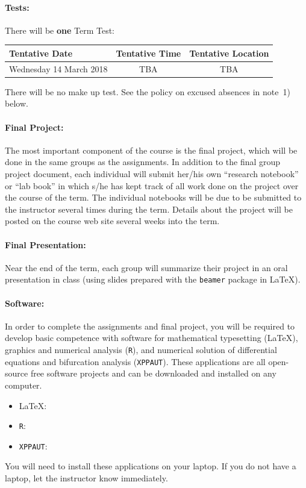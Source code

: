 \documentclass[12pt]{article}
\newcommand{\url}[1]{{\tt\textcolor{blue}{#1}}}
\begin{document}

\paragraph*{Tests:}

There will be {\bf one} Term Test:
\begin{center}
\begin{tabular}{l|c|c}
\bf Tentative Date & \bf Tentative Time & \bf Tentative Location \\\hline
Wednesday 14 March 2018 & TBA & TBA \\
\end{tabular}
\end{center}
\noindent
There will be no make up test. See the policy on excused absences in note~1) below.

\paragraph*{Final Project:}
The most important component of the course is the final project, which will be done in the same groups as the assignments.  In addition to the final group project document, each individual will submit her/his own ``research notebook'' or ``lab book'' in which s/he has kept track of all work done on the project over the course of the term.  The individual notebooks will be due to be submitted to the instructor several times during the term.  Details about the project will be posted on the course web site several weeks into the term.

\paragraph*{Final Presentation:}
Near the end of the term, each group will summarize their project in an oral presentation in class (using slides prepared with the {\tt beamer} package in \LaTeX).

\paragraph*{Software:} In order to complete the assignments and final project, you will be required to develop basic competence with software for mathematical typesetting (\LaTeX), graphics and numerical analysis ({\tt R}), and numerical solution of differential equations and bifurcation analysis ({\tt XPPAUT}).  These applications are all open-source free software projects and can be downloaded and installed on any computer.
\begin{itemize}\addtolength{\itemsep}{-0.5\baselineskip}
\item \LaTeX:\qquad \url{http://www.latex-project.org/}
\item {\tt R}:\qquad \url{http://www.r-project.org}
\item {\tt XPPAUT}:\qquad \url{http://www.math.pitt.edu/\~bard/xpp/xpp.html}
\end{itemize}
\noindent You will need to install these applications on your laptop.  If you do not have a laptop, let the instructor know immediately.
\end{document}
